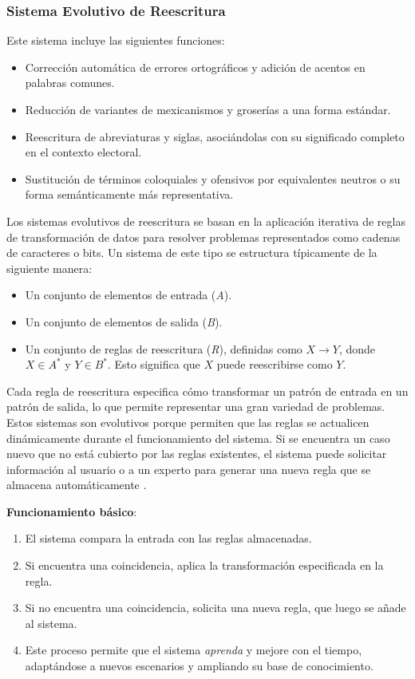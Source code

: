 \documentclass[10pt, a4paper]{article}
\begin{document}
	\subsubsection{Sistema Evolutivo de Reescritura}
	
	Este sistema incluye las siguientes funciones:
	\begin{itemize}
		\item Corrección automática de errores ortográficos y adición de acentos en palabras comunes.
		\item Reducción de variantes de mexicanismos y groserías a una forma estándar.
		\item Reescritura de abreviaturas y siglas, asociándolas con su significado completo en el contexto electoral.
		\item Sustitución de términos coloquiales y ofensivos por equivalentes neutros o su forma semánticamente más representativa.
	\end{itemize}
	
	Los sistemas evolutivos de reescritura se basan en la aplicación iterativa de reglas de transformación de datos para resolver problemas representados como cadenas de caracteres o bits. Un sistema de este tipo se estructura típicamente de la siguiente manera:
	
	\begin{itemize}
		\item Un conjunto de elementos de entrada (\textit{A}).
		\item Un conjunto de elementos de salida (\textit{B}).
		\item Un conjunto de reglas de reescritura (\textit{R}), definidas como $X \rightarrow Y$, donde $X \in A^*$ y $Y \in B^*$. Esto significa que $X$ puede reescribirse como $Y$.
	\end{itemize}
	
	Cada regla de reescritura especifica cómo transformar un patrón de entrada en un patrón de salida, lo que permite representar una gran variedad de problemas. Estos sistemas son evolutivos porque permiten que las reglas se actualicen dinámicamente durante el funcionamiento del sistema. Si se encuentra un caso nuevo que no está cubierto por las reglas existentes, el sistema puede solicitar información al usuario o a un experto para generar una nueva regla que se almacena automáticamente \parencite{galindo1991sistemas}.
	
	\textbf{Funcionamiento básico}:
	\begin{enumerate}
		\item El sistema compara la entrada con las reglas almacenadas.
		\item Si encuentra una coincidencia, aplica la transformación especificada en la regla.
		\item Si no encuentra una coincidencia, solicita una nueva regla, que luego se añade al sistema.
		\item Este proceso permite que el sistema \textit{aprenda} y mejore con el tiempo, adaptándose a nuevos escenarios y ampliando su base de conocimiento.
	\end{enumerate}
	
\end{document}
